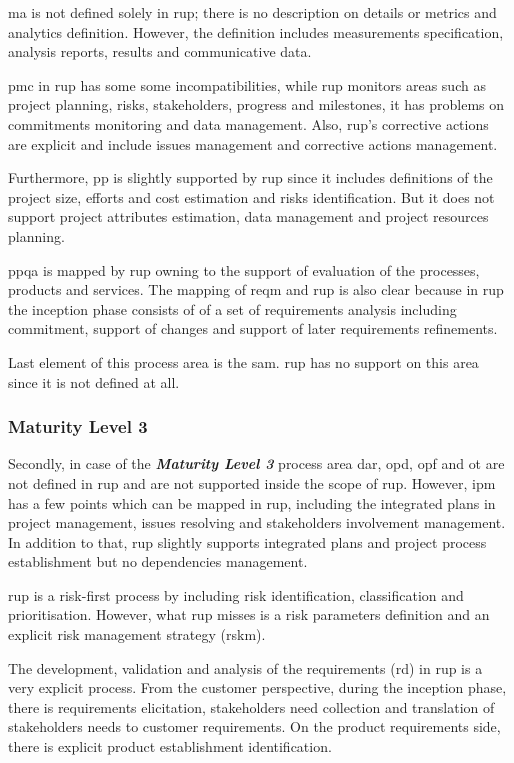 \ac{ma} is not defined solely in \ac{rup}; there is no description on details or metrics and analytics definition. However, the definition includes measurements specification, analysis reports, results and communicative data.

\ac{pmc} in \ac{rup} has some some incompatibilities, while \ac{rup} monitors areas such as project planning, risks, stakeholders, progress and milestones, it has problems on commitments monitoring and data management. Also, \ac{rup}'s corrective actions are explicit and include issues management and corrective actions management.

Furthermore, \ac{pp} is slightly supported by \ac{rup} since it includes definitions of the project size, efforts and cost estimation and risks identification. But it does not support project attributes estimation, data management and project resources planning. 

\ac{ppqa} is mapped by \ac{rup} owning to the support of evaluation of the processes, products and services.
The mapping of \ac{reqm} and \ac{rup} is also clear because in \ac{rup} the inception phase consists of of a set of requirements analysis including commitment, support of changes and support of later requirements refinements. 

Last element of this process area is the \ac{sam}. \ac{rup} has no support on this area since it is not defined at all.

\subsubsection{Maturity Level 3}
Secondly, in case of the \textbf{\textit{Maturity Level 3}} process area \ac{dar}, \ac{opd}, \ac{opf} and \ac{ot} are not defined in \ac{rup} and are not supported inside the scope of \ac{rup}. However, \ac{ipm} has a few points which can be mapped in \ac{rup}, including the integrated plans in project management, issues resolving and stakeholders involvement management. In addition to that, \ac{rup} slightly supports integrated plans and project process establishment but no dependencies management.

\ac{rup} is a risk-first process by including risk identification, classification and prioritisation. However, what \ac{rup} misses is a risk parameters definition and an explicit risk management strategy (\ac{rskm}).

The development, validation and analysis of the requirements (\ac{rd}) in \ac{rup} is a very explicit process. From the customer perspective, during the inception phase, there is requirements elicitation, stakeholders need collection and  translation of stakeholders needs to customer requirements. On the product requirements side, there is explicit product establishment identification.

